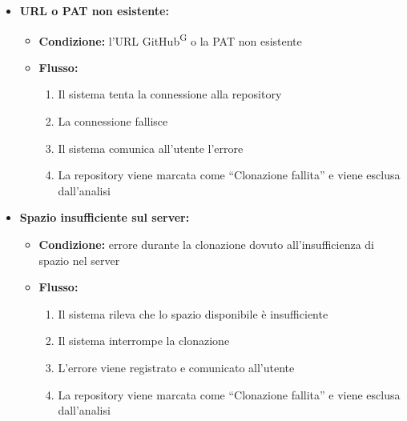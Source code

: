 \documentclass[a4paper, 11pt]{article}
\begin{document}
\begin{itemize}
	\begin{itemize}
		\item \textbf{URL o PAT non esistente:}
			\begin{itemize}
				\item \textbf{Condizione:} l'URL GitHub\textsuperscript{G} o la PAT non esistente
				\item \textbf{Flusso:}
				\begin{enumerate}
					\item Il sistema tenta la connessione alla repository
					\item La connessione fallisce
					\item Il sistema comunica all'utente l'errore
					\item La repository viene marcata come “Clonazione fallita” e viene esclusa dall'analisi
				\end{enumerate}
			\end{itemize}
		\item \textbf{Spazio insufficiente sul server:}
			\begin{itemize}
				\item \textbf{Condizione:} errore durante la clonazione dovuto all'insufficienza di spazio nel server
				\item \textbf{Flusso:}
				\begin{enumerate}
					\item Il sistema rileva che lo spazio disponibile è insufficiente
					\item Il sistema interrompe la clonazione
					\item L'errore viene registrato e comunicato all'utente
					\item La repository viene marcata come “Clonazione fallita” e viene esclusa dall'analisi
				\end{enumerate}
			\end{itemize}
	\end{itemize}
\end{itemize}
\end{document}
